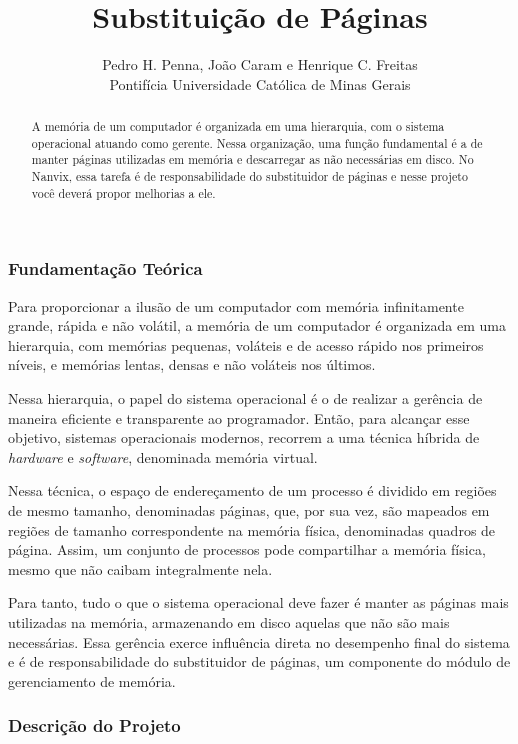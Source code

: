 \documentclass[11pt]{article}
\title{Substituição de Páginas}
\author{Pedro H. Penna, João Caram e Henrique C. Freitas\\[0.3em]
\small Pontifícia Universidade Católica de Minas Gerais}
\date{}
\begin{document}
\maketitle

\begin{abstract}

\noindent A memória de um computador é organizada em uma hierarquia, com o sistema operacional atuando como gerente. Nessa organização, uma função fundamental é a de manter páginas utilizadas em memória e descarregar as não necessárias em disco. No Nanvix, essa tarefa é de responsabilidade do substituidor de páginas e nesse projeto você deverá propor melhorias a ele.

\end{abstract}

\subsubsection*{Fundamentação Teórica}

Para proporcionar a ilusão de um computador com memória infinitamente grande, rápida e não volátil, a memória de um computador é organizada em uma hierarquia, com memórias pequenas, voláteis e de acesso rápido nos primeiros níveis, e memórias lentas, densas e não voláteis nos últimos.

Nessa hierarquia, o papel do sistema operacional é o de realizar a gerência de maneira eficiente e transparente ao programador. Então, para alcançar esse objetivo, sistemas operacionais modernos, recorrem a uma técnica híbrida de \textit{hardware} e \textit{software}, denominada memória virtual.

Nessa técnica, o espaço de endereçamento de um processo é dividido em regiões de mesmo tamanho, denominadas páginas, que, por sua vez, são mapeados em regiões de tamanho correspondente na memória física, denominadas quadros de página. Assim, um conjunto de processos pode compartilhar a memória física, mesmo que não caibam integralmente nela.

Para tanto, tudo o que o sistema operacional deve fazer é manter as páginas mais utilizadas na memória, armazenando em disco aquelas que não são mais necessárias. Essa gerência exerce influência direta no desempenho final do sistema e é de responsabilidade do substituidor de páginas, um componente do módulo de gerenciamento de memória.


\subsubsection*{Descrição do Projeto}
\end{document}
